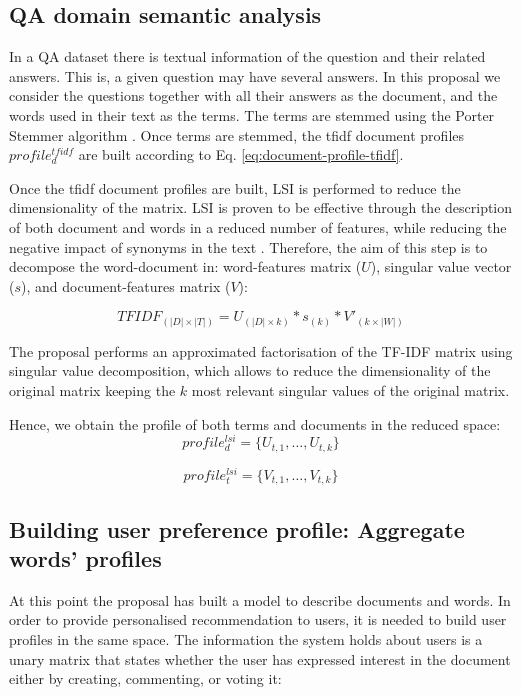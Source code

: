 \documentclass[preprint]{elsarticle}
\begin{document}
\begin{spacing}{1.5}
\subsection{QA domain semantic analysis}

In a QA dataset there is textual information of the question and their related answers. This is, a given question may have several answers. In this proposal we consider the questions together with all their answers as the document, and the words used in their text as the terms. The terms are stemmed using the Porter Stemmer algorithm \citep{Porter1980}. Once terms are stemmed, the tfidf document profiles $profile^{tfidf}_{d}$ are built according to Eq. \ref{eq:document-profile-tfidf}.

Once the tfidf document profiles are built, LSI is performed to reduce the dimensionality of the matrix. LSI is proven to be effective through the description of both document and words in a reduced number of features, while reducing the negative impact of synonyms in the text \cite{}. Therefore, the aim of this step is to decompose the word-document in: word-features matrix ($U$), singular value vector ($s$), and document-features matrix ($V$):

\begin{equation}
	TFIDF_{(|D|\times|T|)} = U_{(|D|\times k)} * s_{(k)} * V'_{(k \times |W|)}
\end{equation}

The proposal performs an approximated factorisation of the TF-IDF matrix using singular value decomposition, which allows to reduce the dimensionality of the original matrix keeping the $k$ most relevant singular values of the original matrix.

Hence, we obtain the profile of both terms and documents in the reduced space:
\begin{equation}
	profile^{lsi}_d = \{ U_{t,1},\dots, U_{t,k}\}
\end{equation}

\begin{equation}
	profile^{lsi}_t = \{ V_{t,1},\dots, V_{t,k}\}
\end{equation}

\subsection{Building user preference profile: Aggregate words' profiles}

At this point the proposal has built a model to describe documents and words. In order to provide personalised recommendation to users, it is needed to build user profiles in the same space. The information the system holds about users is a unary matrix that states whether the user has expressed interest in the document either by creating, commenting, or voting it:


\end{spacing}
\end{document}
